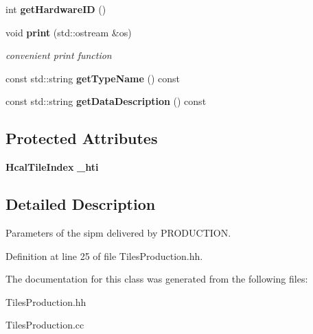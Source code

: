 \begin{DoxyCompactItemize}
\item 
int {\bfseries get\-Hardware\-I\-D} ()\label{classCALICE_1_1TilesProduction_a0e231fffa77a4871cf14b6abbb654c62}

\item 
void {\bf print} (std\-::ostream \&os)\label{classCALICE_1_1TilesProduction_a87511cf3aa3319007a2909baed09ea8e}

\begin{DoxyCompactList}\small\item\em convenient print function \end{DoxyCompactList}\item 
const std\-::string {\bfseries get\-Type\-Name} () const \label{classCALICE_1_1TilesProduction_abe1b268a8c5ec422c44be2ac431f2546}

\item 
const std\-::string {\bfseries get\-Data\-Description} () const \label{classCALICE_1_1TilesProduction_a7a6f5cf764abcee38722460321c9d8e9}

\end{DoxyCompactItemize}
\subsection*{Protected Attributes}
\begin{DoxyCompactItemize}
\item 
{\bf Hcal\-Tile\-Index} {\bfseries \-\_\-hti}\label{classCALICE_1_1TilesProduction_a7292957b19e4f50605378a3a51545973}

\end{DoxyCompactItemize}


\subsection{Detailed Description}
Parameters of the sipm delivered by P\-R\-O\-D\-U\-C\-T\-I\-O\-N. 

Definition at line 25 of file Tiles\-Production.\-hh.



The documentation for this class was generated from the following files\-:\begin{DoxyCompactItemize}
\item 
Tiles\-Production.\-hh\item 
Tiles\-Production.\-cc\end{DoxyCompactItemize}
